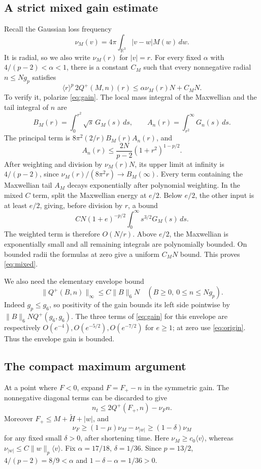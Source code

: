 \documentclass[11pt,a4paper]{article}
\numberwithin{equation}{section}
\theoremstyle{remark}
\newcommand{\R}{\mathbb R}
\newcommand{\la}[1]{\langle #1\rangle}
\newcommand{\dd}{\,d}
\newcommand{\norm}[2]{\lVert #1\rVert_{#2}}
\begin{document}
\subsection*{A strict mixed gain estimate}
Recall the Gaussian loss frequency
\[
 \nu_M(v)=4\pi\int_{\R^3}|v-w|M(w)\dd w.
\]
It is radial, so we also write \(\nu_M(r)\) for \(|v|=r\).
For every fixed \(\alpha\) with \(4/(p-2)<\alpha<1\), there is a
constant \(C_M\) such that every nonnegative radial \(n\leq Ng_p\)
satisfies
\begin{equation}\label{eq:mixed}
 \la r^p\,2Q^+(M,n)(r)
       \leq \alpha\nu_M(r)N+C_MN.
\end{equation}
To verify it, polarize \eqref{eq:gain}. The local mass integral of
the Maxwellian and the tail integral of \(n\) are
\[
 B_M(r)=\int_0^{r^2}\sqrt s\,G_M(s)\dd s,\qquad
 A_n(r)=\int_{r^2}^\infty G_n(s)\dd s.
\]
The principal term is \(8\pi^2(2/r)B_M(r)A_n(r)\), and
\[
 A_n(r)\leq\frac{2N}{p-2}(1+r^2)^{1-p/2}.
\]
After weighting and division by \(\nu_M(r)N\), its upper limit at
infinity is \(4/(p-2)\), since
\(\nu_M(r)/(8\pi^2r)\to B_M(\infty)\).
Every term containing the Maxwellian tail \(A_M\) decays exponentially
after polynomial weighting. In the mixed \(C\) term, split the
Maxwellian energy at \(e/2\). Below \(e/2\), the other input is at least
\(e/2\), giving, before division by \(r\), a bound
\[
 CN(1+e)^{-p/2}\int_0^\infty s^{3/2}G_M(s)\dd s.
\]
The weighted term is therefore \(O(N/r)\). Above \(e/2\), the
Maxwellian is exponentially small and all remaining integrals are
polynomially bounded. On bounded radii the formulas at zero give a
uniform \(C_MN\) bound. This proves \eqref{eq:mixed}.

We also need the elementary envelope bound
\begin{equation}\label{eq:bounded-gain}
 \norm{Q^+(B,n)}{\infty}\leq C\norm{B}{6}N
       \quad(B\geq0,\ 0\leq n\leq Ng_p).
\end{equation}
Indeed \(g_p\leq g_6\), so positivity of the gain bounds its left
side pointwise by
\(\norm{B}{6}NQ^+(g_6,g_6)\).
The three terms of \eqref{eq:gain} for this envelope are respectively
\(O(e^{-4}),O(e^{-5/2}),O(e^{-7/2})\) for \(e\geq1\); at zero use
\eqref{eq:origin}. Thus the envelope gain is bounded.

\subsection*{The compact maximum argument}
At a point where \(F<0\), expand \(F=F_+-n\) in the symmetric gain.
The nonnegative diagonal terms can be discarded to give
\begin{equation}\label{eq:negative-equation}
 n_t\leq2Q^+(F_+,n)-\nu_F n.
\end{equation}
Moreover \(F_+\leq M+\widetilde H+|w|\), and
\[
 \nu_F\geq(1-\mu)\nu_M-\nu_{|w|}
          \geq(1-\delta)\nu_M
\]
for any fixed small \(\delta>0\), after shortening time.
Here \(\nu_M\geq c_0\la v\), whereas
\(\nu_{|w|}\leq C\norm{w}{p}\la v\).
Fix \(\alpha=17/18\), \(\delta=1/36\). Since \(p=13/2\),
\(4/(p-2)=8/9<\alpha\) and \(1-\delta-\alpha=1/36>0\).
\end{document}
